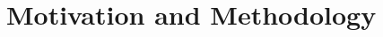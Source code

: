 \documentclass[conference]{IEEEtran}
\begin{document}












\section{Motivation and Methodology}
\end{document}
